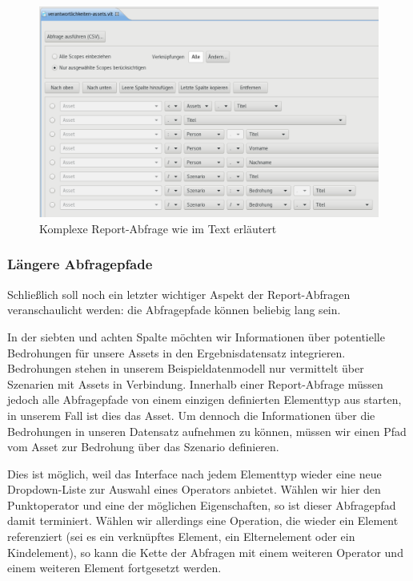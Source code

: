 \documentclass[a4paper,10pt]{book}
\begin{document}
\begin{figure}[htb!]
  \centering
  \includegraphics[width=\linewidth]{Screenshot/query-editor-complex-de.png}
  \caption{Komplexe Report-Abfrage wie im Text erläutert}
  \label{fig:komplexe-report-abfrage}
\end{figure}

\subsubsection{Längere Abfragepfade}\label{luxe4ngere-abfragepfade}

Schließlich soll noch ein letzter wichtiger Aspekt der Report-Abfragen
veranschaulicht werden: die Abfragepfade können beliebig lang sein.

In der siebten und achten Spalte möchten wir Informationen über potentielle
Bedrohungen für unsere Assets in den Ergebnisdatensatz integrieren. Bedrohungen
stehen in unserem Beispieldatenmodell nur vermittelt über Szenarien mit Assets
in Verbindung. Innerhalb einer Report-Abfrage müssen jedoch alle Abfragepfade
von einem einzigen definierten Elementtyp aus starten, in unserem Fall ist dies
das Asset. Um dennoch die Informationen über die Bedrohungen in unseren
Datensatz aufnehmen zu können, müssen wir einen Pfad vom Asset zur Bedrohung
über das Szenario definieren.

Dies ist möglich, weil das Interface nach jedem Elementtyp wieder eine neue
Dropdown-Liste zur Auswahl eines Operators anbietet. Wählen wir hier den
Punktoperator und eine der möglichen Eigenschaften, so ist dieser Abfragepfad
damit terminiert. Wählen wir allerdings eine Operation, die wieder ein Element
referenziert (sei es ein verknüpftes Element, ein Elternelement oder ein
Kindelement), so kann die Kette der Abfragen mit einem weiteren Operator und
einem weiteren Element fortgesetzt werden.
\end{document}

